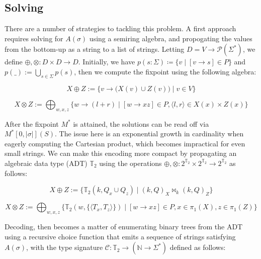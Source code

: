 \documentclass[runningheads]{llncs}
\begin{document}
\subsection{Solving}

There are a number of strategies to tackling this problem. A first approach requires solving for $A(\sigma)$ using a semiring algebra, and propogating the values from the bottom-up as a string to a list of strings. Letting $D = V \rightarrow \mathcal{P}(\Sigma^*)$, we define $\oplus, \otimes: D \times D \rightarrow D$. Initially, we have $p(s: \Sigma) \coloneqq \{v \mid [v \rightarrow s]\in P\}$ and $p(\_) := \bigcup_{s\in \Sigma} p(s)$, then we compute the fixpoint using the following algebra:

\begin{equation}
  X \oplus Z := \{v \rightarrow \big(X(v) \cup Z(v)\big) \mid v \in V\}
\end{equation}

\begin{equation}
  X \otimes Z := \bigoplus_{w, x, z}\big\{w \rightarrow (l + r) \mid [w\rightarrow xz] \in P, \langle l, r\rangle \in X(x) \times Z(x)\big\}
\end{equation}

After the fixpoint $M^*$ is attained, the solutions can be read off via $M^*[0, |\sigma|](S)$. The issue here is an exponential growth in cardinality when eagerly computing the Cartesian product, which becomes impractical for even small strings. We can make this encoding more compact by propagating an algebraic data type (ADT) $\mathbb{T}_2$ using the operations $\oplus, \otimes: 2^{\mathbb{T}_2} \times 2^{\mathbb{T}_2} \rightarrow 2^{\mathbb{T}_2}$ as follows:

\begin{equation}
X \oplus Z := \{\mathbb{T}_2(k, Q_x \cup Q_z) \mid (k, Q)_X \Join_k (k, Q)_Z\}
\end{equation}

\begin{equation}
X \otimes Z := \bigoplus_{w, x, z}\big\{\mathbb{T}_2(w, \{\langle T_x, T_z\rangle\}) \mid [w\rightarrow xz] \in P, x \in \pi_1(X), z \in \pi_1(Z)\big\}
\end{equation}

Decoding, then becomes a matter of enumerating binary trees from the ADT using a recursive choice function that emits a sequence of strings satisfying $A(\sigma)$, with the type signature $\mathcal{C}: \mathbb{T}_2 \rightarrow (\mathbb{N} \rightarrow \Sigma^*)$ defined as follows:
\end{document}
